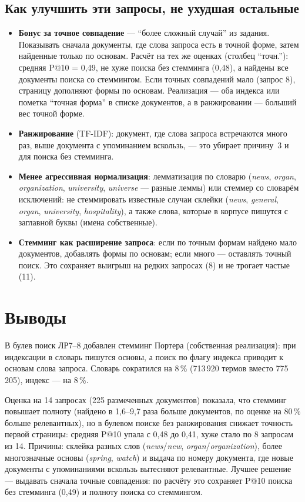 \subsection{Как улучшить эти запросы, не ухудшая остальные}
\begin{itemize}
    \item \textbf{Бонус за точное совпадение} --- \enquote{более сложный случай} из задания. Показывать сначала документы, где слова запроса есть в точной форме, затем найденные только по основам. Расчёт на тех же оценках (столбец \enquote{точн.}): средняя P@10 = 0,49, не хуже поиска без стемминга (0,48), а найдены все документы поиска со стеммингом. Если точных совпадений мало (запрос 8), страницу дополняют формы по основам. Реализация --- оба индекса или пометка \enquote{точная форма} в списке документов, а в ранжировании --- больший вес точной форме.
    \item \textbf{Ранжирование} (TF-IDF): документ, где слова запроса встречаются много раз, выше документа с упоминанием вскользь, --- это убирает причину~3 и для поиска без стемминга.
    \item \textbf{Менее агрессивная нормализация}: лемматизация по словарю (\emph{news}, \emph{organ}, \emph{organization}, \emph{university}, \emph{universe} --- разные леммы) или стеммер со словарём исключений: не стеммировать известные случаи склейки (\emph{news}, \emph{general}, \emph{organ}, \emph{university}, \emph{hospitality}), а также слова, которые в корпусе пишутся с заглавной буквы (имена собственные).
    \item \textbf{Стемминг как расширение запроса}: если по точным формам найдено мало документов, добавлять формы по основам; если много --- оставлять точный поиск. Это сохраняет выигрыш на редких запросах (8) и не трогает частые (11).
\end{itemize}

\section{Выводы}
В булев поиск ЛР7--8 добавлен стемминг Портера (собственная реализация): при индексации в словарь пишутся основы, а поиск по флагу индекса приводит к основам слова запроса. Словарь сократился на 8\,\% (713\,920 термов вместо 775\,205), индекс --- на 8\,\%.

Оценка на 14 запросах (225 размеченных документов) показала, что стемминг повышает полноту (найдено в 1,6--9,7 раза больше документов, по оценке на 80\,\% больше релевантных), но в булевом поиске без ранжирования снижает точность первой страницы: средняя P@10 упала с 0,48 до 0,41, хуже стало по 8 запросам из 14. Причины: склейка разных слов (\emph{news}/\emph{new}, \emph{organ}/\emph{organization}), более многозначные основы (\emph{spring}, \emph{watch}) и выдача по номеру документа, где новые документы с упоминаниями вскользь вытесняют релевантные. Лучшее решение --- выдавать сначала точные совпадения: по расчёту это сохраняет P@10 поиска без стемминга (0,49) и полноту поиска со стеммингом.


